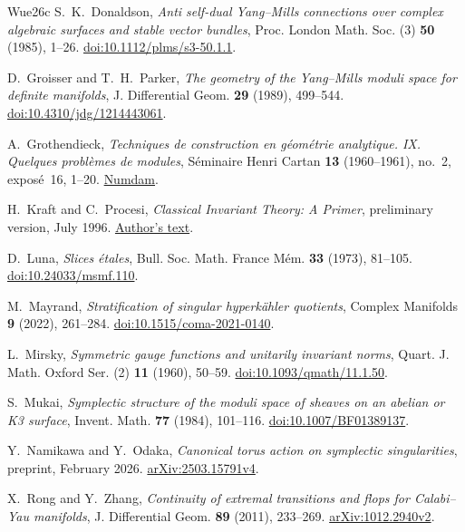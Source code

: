 \begin{thebibliography}{Wue26c}
S.~K.~Donaldson, \textit{Anti self-dual Yang--Mills connections over
complex algebraic surfaces and stable vector bundles},
Proc. London Math. Soc. (3) \textbf{50} (1985), 1--26.
\href{https://doi.org/10.1112/plms/s3-50.1.1}{doi:10.1112/plms/s3-50.1.1}.

D.~Groisser and T.~H.~Parker,
\textit{The geometry of the Yang--Mills moduli space for definite manifolds},
J. Differential Geom. \textbf{29} (1989), 499--544.
\href{https://doi.org/10.4310/jdg/1214443061}{doi:10.4310/jdg/1214443061}.

A.~Grothendieck,
\textit{Techniques de construction en g\'eom\'etrie analytique. IX.
Quelques probl\`emes de modules},
S\'eminaire Henri Cartan \textbf{13} (1960--1961), no.~2, expos\'e~16, 1--20.
\href{https://numdam.org/item/SHC_1960-1961__13_2_A3_0/}{Numdam}.

H.~Kraft and C.~Procesi, \textit{Classical Invariant Theory: A Primer},
preliminary version, July 1996.
\href{https://dmi.unibas.ch/fileadmin/user_upload/dmi/Personen/Kraft_Hanspeter/Classical_Invariant_Theory.pdf}{Author's text}.

D.~Luna, \textit{Slices \'etales},
Bull. Soc. Math. France M\'em. \textbf{33} (1973), 81--105.
\href{https://doi.org/10.24033/msmf.110}{doi:10.24033/msmf.110}.

M.~Mayrand, \textit{Stratification of singular hyperk\"ahler quotients},
Complex Manifolds \textbf{9} (2022), 261--284.
\href{https://doi.org/10.1515/coma-2021-0140}{doi:10.1515/coma-2021-0140}.

L.~Mirsky, \textit{Symmetric gauge functions and unitarily invariant norms},
Quart. J. Math. Oxford Ser. (2) \textbf{11} (1960), 50--59.
\href{https://doi.org/10.1093/qmath/11.1.50}{doi:10.1093/qmath/11.1.50}.

S.~Mukai, \textit{Symplectic structure of the moduli space of sheaves
on an abelian or K3 surface}, Invent. Math. \textbf{77} (1984), 101--116.
\href{https://doi.org/10.1007/BF01389137}{doi:10.1007/BF01389137}.

Y.~Namikawa and Y.~Odaka, \textit{Canonical torus action on symplectic
singularities}, preprint, February 2026.
\href{https://arxiv.org/abs/2503.15791v4}{arXiv:2503.15791v4}.

X.~Rong and Y.~Zhang,
\textit{Continuity of extremal transitions and flops for Calabi--Yau manifolds},
J. Differential Geom. \textbf{89} (2011), 233--269.
\href{https://arxiv.org/abs/1012.2940v2}{arXiv:1012.2940v2}.


\end{thebibliography}
